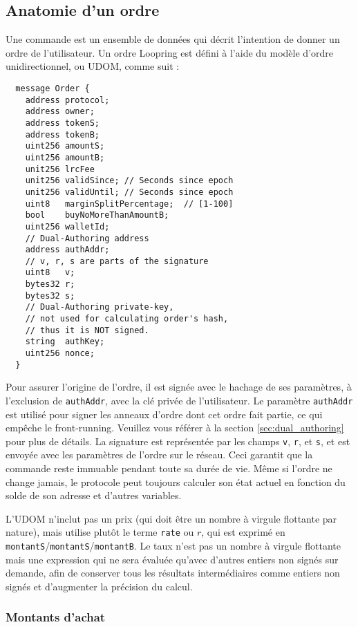 \documentclass[UTF8,nofonts]{article}
\begin{document}
\begin{multicols}{2}
\subsection{Anatomie d'un ordre\label{anatomy}}
Une commande est un ensemble de données qui décrit l'intention de donner un ordre de l'utilisateur. Un ordre Loopring est défini à l'aide du modèle d'ordre unidirectionnel, ou UDOM, comme suit :

\begin{verbatim}
  message Order {
    address protocol;
    address owner;
    address tokenS;
    address tokenB;
    uint256 amountS;
    uint256 amountB;
    unit256 lrcFee
    unit256 validSince; // Seconds since epoch
    unit256 validUntil; // Seconds since epoch
    uint8   marginSplitPercentage;  // [1-100]
    bool    buyNoMoreThanAmountB;
    uint256 walletId;
    // Dual-Authoring address
    address authAddr;
   	// v, r, s are parts of the signature
    uint8   v;       
    bytes32 r;
    bytes32 s;
    // Dual-Authoring private-key,
    // not used for calculating order's hash,
    // thus it is NOT signed.
    string  authKey;          
    uint256 nonce;
  }
\end{verbatim}


Pour assurer l'origine de l’ordre, il est signée avec le hachage de ses paramètres, à l'exclusion de \verb|authAddr|, avec la clé privée de l'utilisateur. Le paramètre \verb|authAddr| est utilisé pour signer les anneaux d'ordre dont cet ordre fait partie, ce qui empêche le front-running. Veuillez vous référer à la section \ref{sec:dual_authoring} pour plus de détails. La signature est représentée par les champs \verb|v|, \verb|r|, et \verb|s|, et est envoyée avec les paramètres de l'ordre sur le réseau. Ceci garantit que la commande reste immuable pendant toute sa durée de vie. Même si l'ordre ne change jamais, le protocole peut toujours calculer son état actuel en fonction du solde de son adresse et d'autres variables.



L'UDOM n'inclut pas un prix (qui doit être un nombre à virgule flottante par nature), mais utilise plutôt le terme \verb|rate| ou $r$, qui est exprimé en \verb|montantS|/\verb|montantS|/\verb|montantB|. Le taux n'est pas un nombre à virgule flottante mais une expression qui ne sera évaluée qu'avec d'autres entiers non signés sur demande, afin de conserver tous les résultats intermédiaires comme entiers non signés et d'augmenter la précision du calcul.

\subsubsection{Montants d'achat}


\end{multicols}
\end{document}
